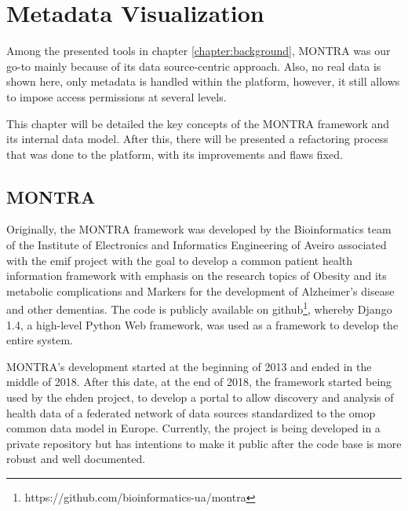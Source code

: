 \chapter{Metadata Visualization}
\graphicspath{{figs/03-visualization/}}
\label{chapter:metadata-visualization}

Among the presented tools in chapter \ref{chapter:background}, MONTRA was our go-to mainly because of its data source-centric approach.
Also, no real data is shown here, only metadata is handled within the platform, however, it still allows to impose access permissions at several levels.

This chapter will be detailed the key concepts of the MONTRA framework and its internal data model.
After this, there will be presented a refactoring process that was done to the platform, with its improvements and flaws fixed.

\section{MONTRA}


Originally, the MONTRA framework was developed by the Bioinformatics team of the Institute of Electronics and Informatics Engineering of Aveiro associated with the \gls{emif} project with the goal to develop a common patient health information framework with emphasis on the research topics of Obesity and its metabolic complications and Markers for the development of Alzheimer's disease and other dementias.
The code is publicly available on github\footnote{https://github.com/bioinformatics-ua/montra}, whereby Django 1.4, a high-level Python Web framework\cite{django}, was used as a framework to develop the entire system.

MONTRA's development started at the beginning of 2013 and ended in the middle of 2018.
After this date, at the end of 2018, the framework started being used by the \gls{ehden} project, to develop a portal to allow discovery and analysis of health data of a federated network of data sources standardized to the \gls{omop} common data model in Europe.
Currently, the project is being developed in a private repository but has intentions to make it public after the code base is more robust and well documented.

